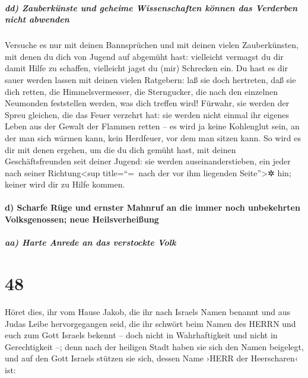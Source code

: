 \hypertarget{dd-zauberkuxfcnste-und-geheime-wissenschaften-kuxf6nnen-das-verderben-nicht-abwenden}{%
\subparagraph{dd) Zauberkünste und geheime Wissenschaften können das
Verderben nicht
abwenden}\label{dd-zauberkuxfcnste-und-geheime-wissenschaften-kuxf6nnen-das-verderben-nicht-abwenden}}

Versuche es nur mit deinen Bannsprüchen und mit deinen
vielen Zauberkünsten, mit denen du dich von Jugend auf abgemüht hast:
vielleicht vermagst du dir damit Hilfe zu schaffen, vielleicht jagst du
(mir) Schrecken ein. Du hast es dir sauer werden lassen
mit deinen vielen Ratgebern: laß sie doch hertreten, daß sie dich
retten, die Himmelsvermesser, die Sterngucker, die nach den einzelnen
Neumonden feststellen werden, was dich treffen wird!
Fürwahr, sie werden der Spreu gleichen, die das Feuer
verzehrt hat: sie werden nicht einmal ihr eigenes Leben aus der Gewalt
der Flammen retten -- es wird ja keine Kohlenglut sein, an der man sich
wärmen kann, kein Herdfeuer, vor dem man sitzen kann. So
wird es dir mit denen ergehen, um die du dich gemüht hast, mit deinen
Geschäftsfreunden seit deiner Jugend: sie werden auseinanderstieben, ein
jeder nach seiner Richtung\textless sup title=``=~nach der vor ihm
liegenden Seite''\textgreater✲ hin; keiner wird dir zu Hilfe kommen.

\hypertarget{d-scharfe-ruxfcge-und-ernster-mahnruf-an-die-immer-noch-unbekehrten-volksgenossen-neue-heilsverheiuxdfung}{%
\paragraph{d) Scharfe Rüge und ernster Mahnruf an die immer noch
unbekehrten Volksgenossen; neue
Heilsverheißung}\label{d-scharfe-ruxfcge-und-ernster-mahnruf-an-die-immer-noch-unbekehrten-volksgenossen-neue-heilsverheiuxdfung}}

\hypertarget{aa-harte-anrede-an-das-verstockte-volk}{%
\subparagraph{aa) Harte Anrede an das verstockte
Volk}\label{aa-harte-anrede-an-das-verstockte-volk}}

\hypertarget{section-47}{%
\section{48}\label{section-47}}

Höret dies, ihr vom Hause Jakob, die ihr nach Israels
Namen benannt und aus Judas Leibe hervorgegangen seid, die ihr schwört
beim Namen des HERRN und euch zum Gott Israels bekennt -- doch nicht in
Wahrhaftigkeit und nicht in Gerechtigkeit --; denn nach
der heiligen Stadt haben sie sich den Namen beigelegt, und auf den Gott
Israels stützen sie sich, dessen Name ›HERR der Heerscharen‹ ist:

